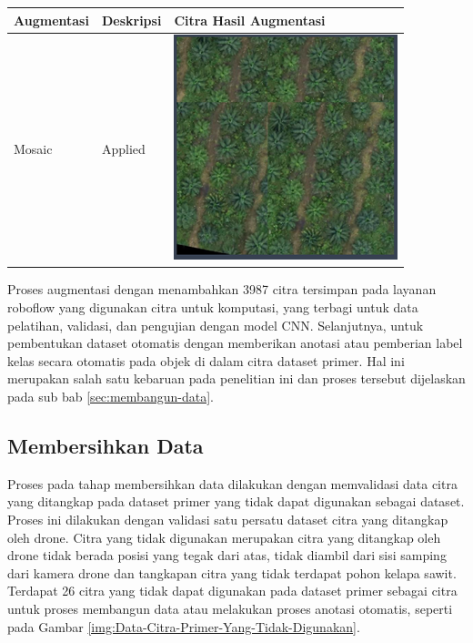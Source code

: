 
\begin{singlespace}
	\begin{table}[H]
		\centering
		\begin{tabular}{|m{3cm}|m{3cm}|m{6cm}|}
			\hline
			\rowcolor[HTML]{D9D9D9} 
			Augmentasi & Deskripsi                                                                & Citra Hasil Augmentasi \\ \hline
			
			
			Mosaic & Applied & \includegraphics[width=0.4\columnwidth]{bab4/Gambar/tbl-5-pic7.png}\\ \hline
			
		\end{tabular}
	\end{table}
\end{singlespace}

Proses augmentasi dengan menambahkan 3987 citra tersimpan pada layanan roboflow yang digunakan citra untuk komputasi, yang terbagi untuk data pelatihan, validasi, dan pengujian dengan model CNN. Selanjutnya, untuk pembentukan dataset otomatis dengan memberikan anotasi atau pemberian label kelas secara otomatis pada objek di dalam citra dataset primer. Hal ini merupakan salah satu kebaruan pada penelitian ini dan proses tersebut dijelaskan pada sub bab \ref{sec:membangun-data}.

\subsection{Membersihkan Data}
\hspace{1,2cm}
Proses pada tahap membersihkan data dilakukan dengan memvalidasi data citra yang ditangkap pada dataset primer yang tidak dapat digunakan sebagai dataset. Proses ini dilakukan dengan validasi satu persatu dataset citra yang ditangkap oleh drone. Citra yang tidak digunakan merupakan citra yang ditangkap oleh drone tidak berada posisi yang tegak dari atas, tidak diambil dari sisi samping dari kamera drone dan tangkapan citra yang tidak terdapat pohon kelapa sawit. Terdapat 26 citra yang tidak dapat digunakan pada dataset primer sebagai citra untuk proses membangun data atau melakukan proses anotasi otomatis, seperti pada Gambar \ref{img:Data-Citra-Primer-Yang-Tidak-Digunakan}.

